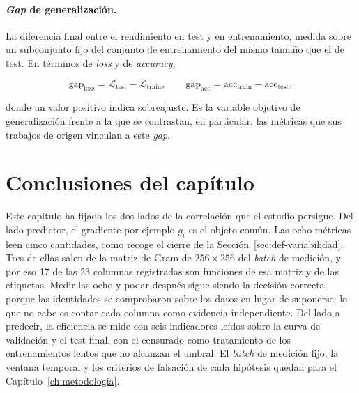 \paragraph{\emph{Gap} de generalización.} La diferencia final entre el rendimiento en test y en
entrenamiento, medida sobre un subconjunto fijo del conjunto de entrenamiento del mismo tamaño que el de test. En términos de \emph{loss} y de \emph{accuracy},

\begin{equation}
\mathrm{gap}_{\text{loss}} = \mathcal{L}_{\text{test}} - \mathcal{L}_{\text{train}},
\qquad
\mathrm{gap}_{\text{acc}} = \mathrm{acc}_{\text{train}} - \mathrm{acc}_{\text{test}},
\label{eq:gap}
\end{equation}

donde un valor positivo indica sobreajuste. Es la variable objetivo de generalización frente a la que se contrastan, en particular, las métricas que sus trabajos de origen vinculan a este \emph{gap}.

\section{Conclusiones del capítulo}
\label{sec:fund-conclusiones}

Este capítulo ha fijado los dos lados de la correlación que el estudio persigue. Del lado predictor, el gradiente por ejemplo $g_i$ es el objeto común. Las ocho métricas leen cinco cantidades, como recoge el cierre de la Sección~\ref{sec:def-variabilidad}. Tres de ellas salen de la matriz de Gram de $256 \times 256$ del \emph{batch} de medición, y por eso 17 de las 23 columnas registradas son funciones de esa matriz y de las etiquetas. Medir las ocho y podar después sigue siendo la decisión correcta, porque las identidades se comprobaron sobre los datos en lugar de suponerse; lo que no cabe es contar cada columna como evidencia independiente. Del lado a predecir, la eficiencia se mide con seis indicadores leídos sobre la curva de validación y el test final, con el censurado como tratamiento de los entrenamientos lentos que no alcanzan el umbral. El \emph{batch} de medición fijo, la ventana temporal y los criterios de falsación de cada hipótesis quedan para el Capítulo~\ref{ch:metodologia}.
